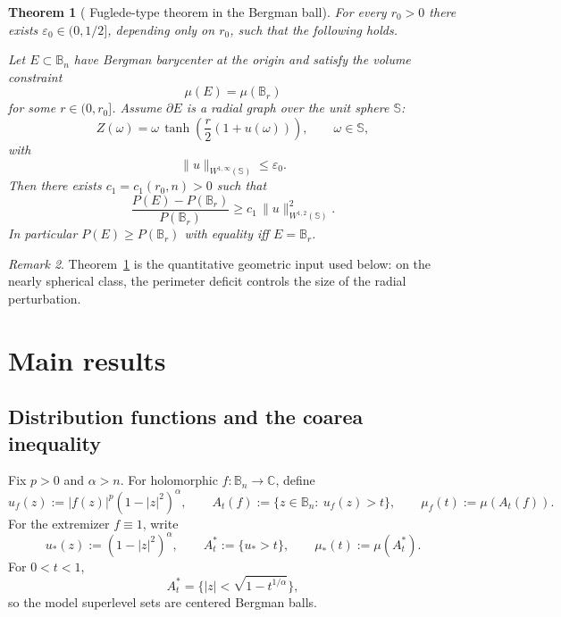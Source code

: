 \documentclass[11pt]{amsart}
\theoremstyle{plain}
\newtheorem{theorem}{Theorem}[section]
\theoremstyle{definition}
\theoremstyle{remark}
\newtheorem{remark}[theorem]{Remark}
\newcommand{\B}{\mathbb{B}}
\newcommand{\Bn}{\mathbb{B}_n}
\newcommand{\Sph}{\mathbb{S}}
\newcommand{\C}{\mathbb{C}}
\begin{document}
\begin{theorem}[\cite{KalajBergman2026Arxiv} Fuglede-type theorem in the Bergman ball]\label{thm:fuglede_bergman}
For every $r_0>0$ there exists $\varepsilon_0\in(0,1/2]$, depending only on $r_0$, such that the following holds.

Let $E\subset \Bn$ have Bergman barycenter at the origin and satisfy the volume constraint
\begin{equation*}\label{eq:vol_constraint_thm}
\mu(E)=\mu(\mathbb{B}_r)
\end{equation*}
for some $r\in(0,r_0]$. Assume $\partial E$ is a radial graph over the unit sphere $\Sph$:
\begin{equation}\label{eq:graph_param_thm}
Z(\omega)=\omega\,\tanh\!\left(\frac r2(1+u(\omega))\right),\qquad \omega\in\Sph,
\end{equation}
with
\begin{equation*}\label{eq:u_small_thm}
\|u\|_{W^{1,\infty}(\Sph)}\le \varepsilon_0.
\end{equation*}
Then there exists $c_1=c_1(r_0,n)>0$ such that
\begin{equation*}\label{eq:fuglede_estimate}
\frac{P(E)-P(\mathbb{B}_r)}{P(\mathbb{B}_r)}\ge c_1\,\|u\|_{W^{1,2}(\Sph)}^2.
\end{equation*}
In particular $P(E)\ge P(\mathbb{B}_r)$ with equality iff $E=\mathbb{B}_r$.
\end{theorem}

\begin{remark}
Theorem~\ref{thm:fuglede_bergman} is the quantitative geometric input used below: on the nearly spherical class, the perimeter deficit controls the size of the radial perturbation.
\end{remark}

\section{Main results}

\subsection{Distribution functions and the coarea inequality}\label{sec:distribution_coarea}

Fix $p>0$ and $\alpha>n$. For holomorphic $f:\B_n\to\C$, define
\begin{equation*}\label{eq:u_ball}
u_f(z):=|f(z)|^p(1-|z|^2)^\alpha,
\qquad
A_t(f):=\{z\in\B_n:\ u_f(z)>t\},
\qquad
\mu_f(t):=\mu(A_t(f)).
\end{equation*}
For the extremizer $f\equiv1$, write
\[
u_*(z):=(1-|z|^2)^\alpha,
\qquad
A_t^*:=\{u_*>t\},
\qquad
\mu_*(t):=\mu(A_t^*).
\]
For $0<t<1$,
\[
A_t^*=\{|z|<\sqrt{1-t^{1/\alpha}}\},
\]
so the model superlevel sets are centered Bergman balls.
\end{document}
